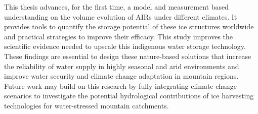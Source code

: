 This thesis advances, for the first time, a model and measurement based understanding on the volume evolution of
AIRs under different climates. It provides tools to quantify the storage potential of these ice structures
worldwide and practical strategies to improve their efficacy. This study improves the scientific evidence needed
to upscale this indigenous water storage technology. These findings are essential to design these nature-based
solutions that increase the reliability of water supply in highly seasonal and arid environments and improve
water security and climate change adaptation in mountain regions. Future work may build on this research by
fully integrating climate change scenarios to investigate the potential hydrological contributions of ice
harvesting technologies for water-stressed mountain catchments.
